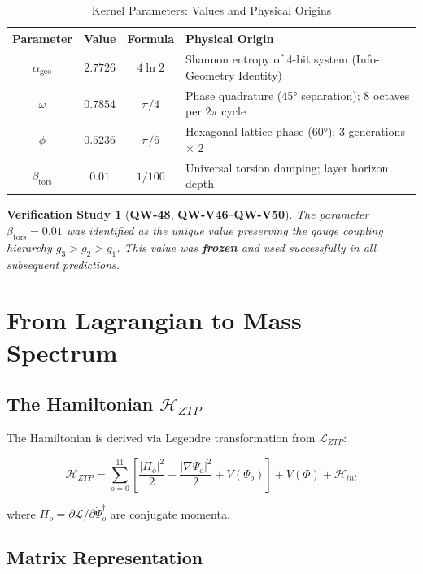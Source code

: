 \documentclass[11pt, a4paper]{article}
\newtheorem{verification}{Verification Study}[section]
\theoremstyle{remark}
\newcommand{\Lagr}{\mathcal{L}}
\newcommand{\Ham}{\mathcal{H}}
\newcommand{\alphageo}{\alpha_{\text{geo}}}
\newcommand{\betators}{\beta_{\text{tors}}}
\newcommand{\QW}[1]{\textbf{QW-#1}}
\begin{document}
\begin{table}[H]
\centering
\caption{Kernel Parameters: Values and Physical Origins}
\begin{tabular}{|c|c|c|p{6cm}|}
\hline
\textbf{Parameter} & \textbf{Value} & \textbf{Formula} & \textbf{Physical Origin} \\
\hline
$\alphageo$ & $2.7726$ & $4 \ln 2$ & Shannon entropy of 4-bit system (Info-Geometry Identity) \\
\hline
$\omega$ & $0.7854$ & $\pi/4$ & Phase quadrature (45° separation); 8 octaves per $2\pi$ cycle \\
\hline
$\phi$ & $0.5236$ & $\pi/6$ & Hexagonal lattice phase (60°); 3 generations $\times$ 2 \\
\hline
$\betators$ & $0.01$ & $1/100$ & Universal torsion damping; layer horizon depth \\
\hline
\end{tabular}
\end{table}

\begin{verification}[\QW{48}, \QW{V46}--\QW{V50}]
The parameter $\betators = 0.01$ was identified as the unique value preserving the gauge coupling hierarchy $g_3 > g_2 > g_1$. This value was \textbf{frozen} and used successfully in all subsequent predictions.
\end{verification}

\section{From Lagrangian to Mass Spectrum}

\subsection{The Hamiltonian $\Ham_{ZTP}$}

The Hamiltonian is derived via Legendre transformation from $\Lagr_{ZTP}$:

\begin{equation}
\Ham_{ZTP} = \sum_{o=0}^{11} \left[ \frac{|\Pi_o|^2}{2} + \frac{|\nabla\Psi_o|^2}{2} + V(\Psi_o) \right] + V(\Phi) + \Ham_{int}
\end{equation}

where $\Pi_o = \partial\Lagr/\partial\dot{\Psi}_o^\dagger$ are conjugate momenta.

\subsection{Matrix Representation}
\end{document}
